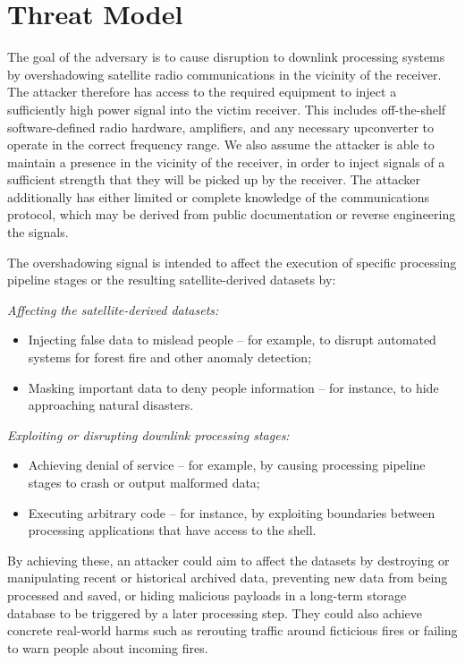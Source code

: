 \section{Threat Model}\label{sec:threat-model}

The goal of the adversary is to cause disruption to downlink processing systems by overshadowing satellite radio communications in the vicinity of the receiver.
The attacker therefore has access to the required equipment to inject a sufficiently high power signal into the victim receiver.
This includes off-the-shelf software-defined radio hardware, amplifiers, and any necessary upconverter to operate in the correct frequency range.
We also assume the attacker is able to maintain a presence in the vicinity of the receiver, in order to inject signals of a sufficient strength that they will be picked up by the receiver.
The attacker additionally has either limited or complete knowledge of the communications protocol, which may be derived from public documentation or reverse engineering the signals.

The overshadowing signal is intended to affect the execution of specific processing pipeline stages or the resulting satellite-derived datasets by:


\noindent\textit{Affecting the satellite-derived datasets:}
\begin{itemize}
    \item Injecting false data to mislead people -- for example, to disrupt automated systems for forest fire and other anomaly detection;
    \item Masking important data to deny people information -- for instance, to hide approaching natural disasters.
\end{itemize}

\noindent\textit{Exploiting or disrupting downlink processing stages:}
\begin{itemize}
    \item Achieving denial of service -- for example, by causing processing pipeline stages to crash or output malformed data;
    \item Executing arbitrary code -- for instance, by exploiting boundaries between processing applications that have access to the shell.
\end{itemize}

By achieving these, an attacker could aim to affect the datasets by destroying or manipulating recent or historical archived data, preventing new data from being processed and saved, or hiding malicious payloads in a long-term storage database to be triggered by a later processing step.
They could also achieve concrete real-world harms such as rerouting traffic around ficticious fires or failing to warn people about incoming fires.

